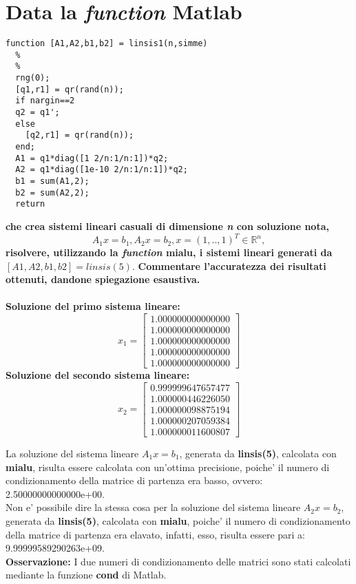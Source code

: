 \documentclass[10pt,a4paper]{article}
\begin{document}
\section{Data la \textit{function} Matlab}
\begin{lstlisting}[style=Matlab-editor]
  function [A1,A2,b1,b2] = linsis1(n,simme)
  %
  %
  rng(0);
  [q1,r1] = qr(rand(n));
  if nargin==2
  q2 = q1';
  else
    [q2,r1] = qr(rand(n));
  end;
  A1 = q1*diag([1 2/n:1/n:1])*q2;
  A2 = q1*diag([1e-10 2/n:1/n:1])*q2;
  b1 = sum(A1,2);
  b2 = sum(A2,2);
  return
\end{lstlisting}
  \textbf{che crea sistemi lineari casuali di dimensione \textit{n} con soluzione nota,}
  $$ A_1x = b_1, A_2x = b_2, x = (1,..,1)^T \in \mathbb{R}^{\textit{n}}, $$
  \textbf{risolvere, utilizzando la \textit{function} \textbf{mialu}, i sistemi lineari generati da
  $ [A1,A2,b1,b2]=linsis(5)$}.
  \textbf{Commentare l'accuratezza dei risultati ottenuti, dandone spiegazione esaustiva.}
\\\\
\textbf{Soluzione del primo sistema lineare:}
\[
  x_1 =
  \begin{bmatrix}
    1.000000000000000 \\
    1.000000000000000 \\
    1.000000000000000 \\
    1.000000000000000 \\
    1.000000000000000
  \end{bmatrix}
\]
\textbf{Soluzione del secondo sistema lineare:}
\[
  x_2 =
  \begin{bmatrix}
    0.999999647657477 \\
    1.000000446226050 \\
    1.000000098875194 \\
    1.000000207059384 \\
    1.000000011600807
  \end{bmatrix}
\]

La soluzione del sistema lineare $ A_1x = b_1 $, generata da \textbf{linsis(5)}, calcolata con \textbf{mialu},
risulta essere calcolata con un'ottima precisione, poiche' il numero di condizionamento della matrice
di partenza era basso, ovvero: 2.50000000000000e+00.
\\
Non e' possibile dire la stessa cosa per la soluzione del sistema lineare $ A_2x = b_2 $, generata da \textbf{linsis(5)},
calcolata con \textbf{mialu}, poiche' il numero di condizionamento della matrice di partenza era elavato, infatti,
esso, risulta essere pari a: 9.99999589290263e+09.
\\
\textbf{Osservazione:} I due numeri di condizionamento delle matrici sono stati calcolati mediante la funzione \textbf{cond} di Matlab.
\end{document}
